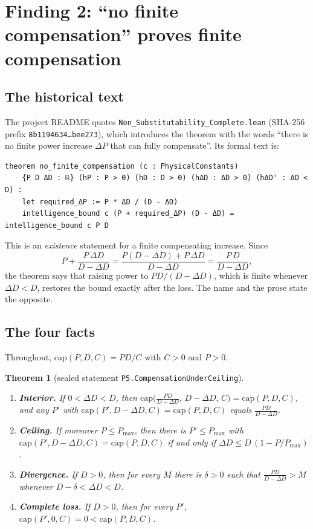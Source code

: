 \documentclass[11pt]{article}
\newtheorem{theorem}{Theorem}
\theoremstyle{remark}
\begin{document}
\section{Finding 2: ``no finite compensation'' proves finite compensation}\label{sec:comp}

\subsection{The historical text}
The project README quotes \texttt{Non\_Substitutability\_Complete.lean} (SHA-256 prefix
\texttt{8b1194634\ldots bee273}), which introduces the theorem with the words ``there is no finite
power increase $\Delta P$ that can fully compensate''. Its formal text is:
\begin{lstlisting}
theorem no_finite_compensation (c : PhysicalConstants)
    {P D ΔD : ℝ} (hP : P > 0) (hD : D > 0) (hΔD : ΔD > 0) (hΔD' : ΔD < D) :
    let required_ΔP := P * ΔD / (D - ΔD)
    intelligence_bound c (P + required_ΔP) (D - ΔD) = intelligence_bound c P D
\end{lstlisting}
This is an \emph{existence} statement for a finite compensating increase. Since
\[
  P+\frac{P\,\Delta D}{D-\Delta D}=\frac{P(D-\Delta D)+P\,\Delta D}{D-\Delta D}
  =\frac{P\,D}{D-\Delta D},
\]
the theorem says that raising power to $PD/(D-\Delta D)$, which is finite whenever
$\Delta D<D$, restores the bound exactly after the loss. The name and the prose state the
opposite.

\subsection{The four facts}
Throughout, $\mathrm{cap}(P,D,C)=PD/C$ with $C>0$ and $P>0$.

\begin{theorem}[sealed statement \texttt{P5.CompensationUnderCeiling}]\label{thm:comp}
\leavevmode
\begin{enumerate}
\item \textbf{Interior.} If $0<\Delta D<D$, then
  $\mathrm{cap}\bigl(\tfrac{PD}{D-\Delta D},\,D-\Delta D,\,C\bigr)=\mathrm{cap}(P,D,C)$, and any
  $P'$ with $\mathrm{cap}(P',D-\Delta D,C)=\mathrm{cap}(P,D,C)$ equals $\tfrac{PD}{D-\Delta D}$.
\item \textbf{Ceiling.} If moreover $P\le P_{\max}$, then there is $P'\le P_{\max}$ with
  $\mathrm{cap}(P',D-\Delta D,C)=\mathrm{cap}(P,D,C)$ if and only if
  $\Delta D\le D\,(1-P/P_{\max})$.
\item \textbf{Divergence.} If $D>0$, then for every $M$ there is $\delta>0$ such that
  $\tfrac{PD}{D-\Delta D}>M$ whenever $D-\delta<\Delta D<D$.
\item \textbf{Complete loss.} If $D>0$, then for every $P'$,
  $\mathrm{cap}(P',0,C)=0<\mathrm{cap}(P,D,C)$.
\end{enumerate}
\end{theorem}
\end{document}
